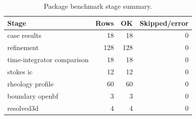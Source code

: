 \begin{table}[!htb]
    \centering
    \scriptsize
    \caption{Package benchmark stage summary.}
    \begin{tabular}{@{}lrrr@{}}
        \toprule
        Stage & Rows & OK & Skipped/error \\
        \midrule
        case results & 18 & 18 & 0 \\
        refinement & 128 & 128 & 0 \\
        time-integrator comparison & 18 & 18 & 0 \\
        stokes ic & 12 & 12 & 0 \\
        rheology profile & 60 & 60 & 0 \\
        boundary openbf & 3 & 3 & 0 \\
        resolved3d & 4 & 4 & 0 \\
        \bottomrule
    \end{tabular}
\end{table}

